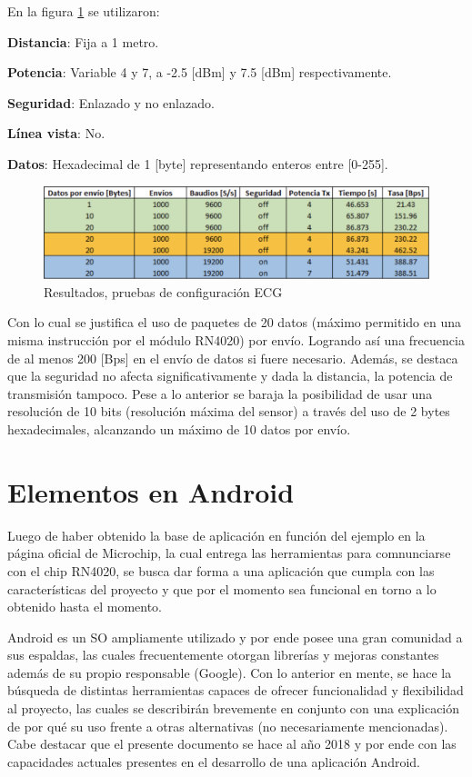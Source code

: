 En la figura \ref{benchmark} se utilizaron:

\textbf{Distancia}:  Fija a 1 metro.

\textbf{Potencia}: Variable 4 y 7, a -2.5 [dBm] y 7.5 [dBm] respectivamente.

\textbf{Seguridad}: Enlazado y no enlazado.

\textbf{Línea vista}: No.

\textbf{Datos}: Hexadecimal de 1 [byte] representando enteros entre [0-255].


\begin{figure}[H]
	\centering
	\includegraphics[scale=0.3]{figuras/proto1/benchmark.png}
	\caption{Resultados, pruebas de configuración ECG}
	\label{benchmark}
\end{figure}

Con lo cual se justifica el uso de paquetes de 20 datos (máximo permitido en una misma instrucción por el módulo RN4020) por envío. Logrando así una frecuencia de al menos 200 [Bps] en el envío de datos si fuere necesario.
Además, se destaca que la seguridad no afecta significativamente y dada la distancia, la potencia de transmisión tampoco. Pese a lo anterior se baraja la posibilidad de usar una resolución de 10 bits (resolución máxima del sensor) a través del uso de 2 bytes hexadecimales, alcanzando un máximo de 10 datos por envío.

\section{Elementos en Android}

Luego de haber obtenido la base de aplicación en función del ejemplo en la página oficial de Microchip, la cual entrega las herramientas para comnunciarse con el chip RN4020, se busca dar forma a una aplicación que cumpla con las características del proyecto y que por el momento sea funcional en torno a lo obtenido hasta el momento.

Android es un SO ampliamente utilizado y por ende posee una gran comunidad a sus espaldas, las cuales frecuentemente otorgan librerías y mejoras constantes además de su propio responsable (Google). Con lo anterior en mente, se hace la búsqueda de distintas herramientas capaces de ofrecer funcionalidad y flexibilidad al proyecto, las cuales se describirán brevemente en conjunto con una explicación de por qué su uso frente a otras alternativas (no necesariamente mencionadas). Cabe destacar que el presente documento se hace al año 2018 y por ende con las capacidades actuales presentes en el desarrollo de una aplicación Android.\newline

